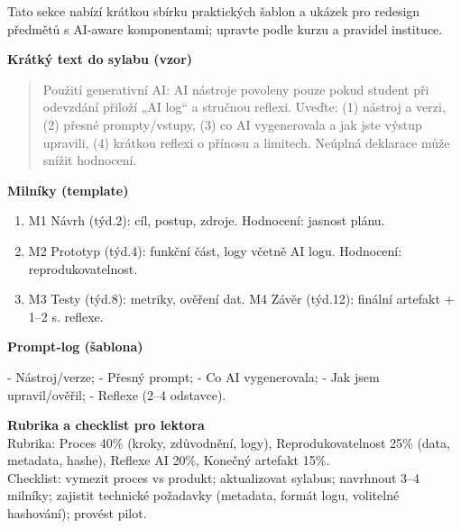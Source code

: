 Tato sekce nabízí krátkou sbírku praktických šablon a ukázek pro redesign předmětů s AI‑aware komponentami; upravte podle kurzu a pravidel instituce.

\bigskip

\textbf{Krátký text do sylabu (vzor)}
\begin{quote}
Použití generativní AI: AI nástroje povoleny pouze pokud student při odevzdání přiloží „AI log“ a stručnou reflexi. Uveďte: (1) nástroj a verzi, (2) přesné prompty/vstupy, (3) co AI vygenerovala a jak jste výstup upravili, (4) krátkou reflexi o přínosu a limitech. Neúplná deklarace může snížit hodnocení.
\end{quote}

\bigskip

\textbf{Milníky (template)}
\begin{enumerate}
  \item M1 Návrh (týd.2): cíl, postup, zdroje. Hodnocení: jasnost plánu.
  \item M2 Prototyp (týd.4): funkční část, logy včetně AI logu. Hodnocení: reprodukovatelnost.
  \item M3 Testy (týd.8): metriky, ověření dat. M4 Závěr (týd.12): finální artefakt + 1–2 s. reflexe.
\end{enumerate}

\bigskip

\textbf{Prompt‑log (šablona)}\\
\begin{PromptBlock}

- Nástroj/verze; - Přesný prompt; - Co AI vygenerovala; - Jak jsem upravil/ověřil; - Reflexe (2–4 odstavce).
\end{PromptBlock}


\bigskip

\textbf{Rubrika a checklist pro lektora}\\
Rubrika: Proces 40\% (kroky, zdůvodnění, logy), Reprodukovatelnost 25\% (data, metadata, hashe), Reflexe AI 20\%, Konečný artefakt 15\%.\\
Checklist: vymezit proces vs produkt; aktualizovat sylabus; navrhnout 3–4 milníky; zajistit technické požadavky (metadata, formát logu, volitelné hashování); provést pilot.
